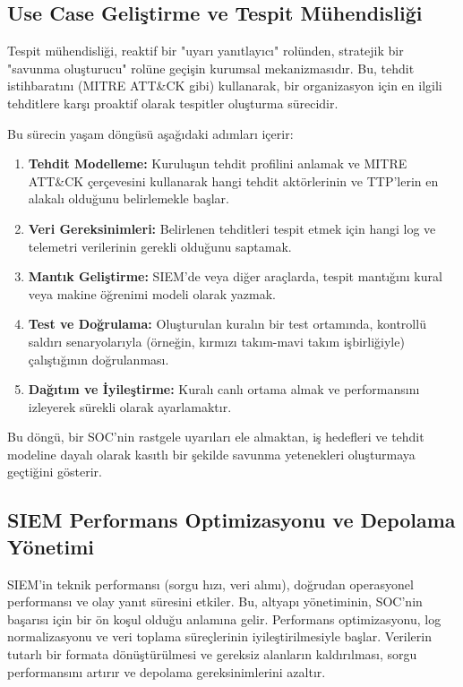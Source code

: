\subsection{Use Case Geliştirme ve Tespit Mühendisliği}

Tespit mühendisliği, reaktif bir "uyarı yanıtlayıcı" rolünden, stratejik bir "savunma oluşturucu" rolüne geçişin kurumsal mekanizmasıdır. Bu, tehdit istihbaratını (MITRE ATT\&CK gibi) kullanarak, bir organizasyon için en ilgili tehditlere karşı proaktif olarak tespitler oluşturma sürecidir.

Bu sürecin yaşam döngüsü aşağıdaki adımları içerir:
\begin{enumerate}
    \item \textbf{Tehdit Modelleme:} Kuruluşun tehdit profilini anlamak ve MITRE ATT\&CK çerçevesini kullanarak hangi tehdit aktörlerinin ve TTP'lerin en alakalı olduğunu belirlemekle başlar.
    \item \textbf{Veri Gereksinimleri:} Belirlenen tehditleri tespit etmek için hangi log ve telemetri verilerinin gerekli olduğunu saptamak.
    \item \textbf{Mantık Geliştirme:} SIEM'de veya diğer araçlarda, tespit mantığını kural veya makine öğrenimi modeli olarak yazmak.
    \item \textbf{Test ve Doğrulama:} Oluşturulan kuralın bir test ortamında, kontrollü saldırı senaryolarıyla (örneğin, kırmızı takım-mavi takım işbirliğiyle) çalıştığının doğrulanması.
    \item \textbf{Dağıtım ve İyileştirme:} Kuralı canlı ortama almak ve performansını izleyerek sürekli olarak ayarlamaktır.
\end{enumerate}

Bu döngü, bir SOC'nin rastgele uyarıları ele almaktan, iş hedefleri ve tehdit modeline dayalı olarak kasıtlı bir şekilde savunma yetenekleri oluşturmaya geçtiğini gösterir.

\subsection{SIEM Performans Optimizasyonu ve Depolama Yönetimi}

SIEM'in teknik performansı (sorgu hızı, veri alımı), doğrudan operasyonel performansı ve olay yanıt süresini etkiler. Bu, altyapı yönetiminin, SOC'nin başarısı için bir ön koşul olduğu anlamına gelir. Performans optimizasyonu, log normalizasyonu ve veri toplama süreçlerinin iyileştirilmesiyle başlar. Verilerin tutarlı bir formata dönüştürülmesi ve gereksiz alanların kaldırılması, sorgu performansını artırır ve depolama gereksinimlerini azaltır.

